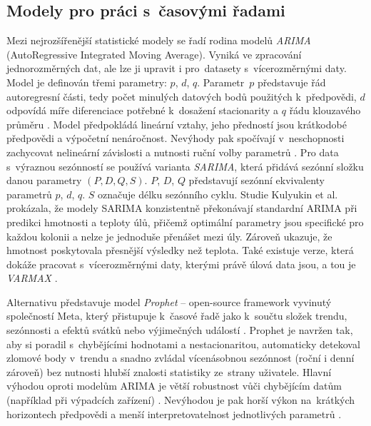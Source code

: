 \subsection*{Modely pro práci s~časovými řadami}
Mezi nejrozšířenější statistické modely se řadí rodina modelů \textit{ARIMA} (AutoRegressive Integrated Moving Average). Vyniká ve zpracování jednorozměrných dat, ale lze ji upravit i pro~datasety s~vícerozměrnými daty. Model je definován třemi parametry: \(p\), \(d\), \(q\). Parametr~\(p\) představuje řád autoregresní části, tedy počet minulých datových bodů použitých k~předpovědi, \(d\) odpovídá míře diferenciace potřebné k~dosažení stacionarity a \(q\) řádu klouzavého průměru \cite{ML-IBM}. Model předpokládá lineární vztahy, jeho předností jsou krátkodobé předpovědi a výpočetní nenáročnost. Nevýhody pak spočívají v~neschopnosti zachycovat nelineární závislosti a nutnosti ruční volby parametrů \cite{Yadav2022}. Pro data s~výraznou sezónností se používá varianta \textit{SARIMA}, která přidává sezónní složku danou parametry \((P, D, Q, S)\). \(P\), \(D\), \(Q\) představují sezónní ekvivalenty parametrů \(p\), \(d\), \(q\). \(S\) označuje délku sezónního cyklu. Studie Kulyukin et al. \cite{Kulyukin2025} prokázala, že modely SARIMA konzistentně překonávají standardní ARIMA při predikci hmotnosti a teploty úlů, přičemž optimální parametry jsou specifické pro každou kolonii a nelze je jednoduše přenášet mezi úly. Zároveň ukazuje, že hmotnost poskytovala přesnější výsledky než teplota. Také existuje verze, která dokáže pracovat s~vícerozměrnými daty, kterými právě úlová data jsou, a tou je \textit{VARMAX} \cite{ML-IBM}.

Alternativu představuje model \textit{Prophet} -- open-source framework vyvinutý společností Meta, který přistupuje k~časové řadě jako k~součtu složek trendu, sezónnosti a efektů svátků nebo výjimečných událostí \cite{Yadav2022}. Prophet je navržen tak, aby si poradil s~chybějícími hodnotami a nestacionaritou, automaticky detekoval zlomové body v~trendu a snadno zvládal vícenásobnou sezónnost (roční i denní zároveň) bez nutnosti hlubší znalosti statistiky ze~strany uživatele. Hlavní výhodou oproti modelům ARIMA je větší robustnost vůči chybějícím datům (například při výpadcích zařízení) \cite{Taylor2018}. Nevýhodou je pak horší výkon na~krátkých horizontech předpovědi a menší interpretovatelnost jednotlivých parametrů \cite{Yadav2022}.

